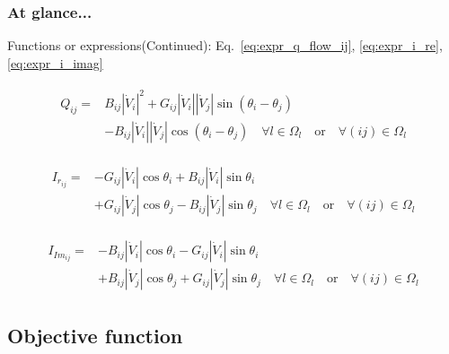 \documentclass[
	11pt, %
	aspectratio=169, %
]{beamer}
\begin{document}
\begin{frame}
	\frametitle{At glance...}
	
	Functions or expressions(Continued): Eq.~\eqref{eq:expr_q_flow_ij}, \eqref{eq:expr_i_re}, \eqref{eq:expr_i_imag}
	
	\begin{align*}
		\begin{split}
			Q_{ij}=&B_{ij}\left\lvert \dot{V}_{i}\right\rvert^{2} + G_{ij}\left\lvert \dot{V}_{i}\right\rvert\left\lvert \dot{V}_{j}\right\rvert \sin{\left(\theta_{i}-\theta_{j}\right)} \\
			&- B_{ij}\left\lvert \dot{V}_{i}\right\rvert\left\lvert \dot{V}_{j}\right\rvert \cos{\left(\theta_{i}-\theta_{j}\right)}  \quad   \forall l \in \Omega_{l} \quad \text{or} \quad \forall (ij) \in \Omega_{l}
		\end{split}
	\end{align*}
	
	\begin{align*}
		\begin{split}
	 		I_{r_{ij}} = &-G_{ij}\left\lvert \dot{V}_{i} \right\rvert \cos{\theta_{i}} + B_{ij}\left\lvert \dot{V}_{i} \right\rvert \sin{\theta_{i}} \\
					&+ G_{ij}\left\lvert \dot{V}_{j} \right\rvert \cos{\theta_{j}} - B_{ij}\left\lvert \dot{V}_{j} \right\rvert \sin{\theta_{j}} \quad \forall l \in \Omega_{l} \quad \text{or} \quad \forall (ij) \in \Omega_{l}
		\end{split}
	\end{align*}

	\begin{align*}
		\begin{split}
	 		I_{Im_{ij}} = &-B_{ij}\left\lvert \dot{V}_{i} \right\rvert \cos{\theta_{i}} - G_{ij}\left\lvert \dot{V}_{i} \right\rvert \sin{\theta_{i}} \\
			&+ B_{ij}\left\lvert \dot{V}_{j} \right\rvert \cos{\theta_{j}} + G_{ij}\left\lvert \dot{V}_{j} \right\rvert \sin{\theta_{j}} \quad \forall l \in \Omega_{l} \quad \text{or} \quad \forall (ij) \in \Omega_{l}
		\end{split}
	\end{align*}

	
\end{frame}




\subsection{Objective function}
\end{document}
